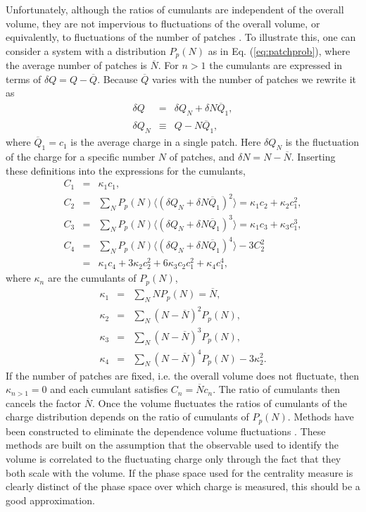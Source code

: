 Unfortunately, although the ratios of cumulants are independent of the overall volume, they are not impervious to fluctuations of the overall volume, or equivalently, to fluctuations of the number of patches \cite{Gazdzicki:1992ri,Gorenstein:2011vq,Gazdzicki:2013ana}. To illustrate this, one can consider a system with a distribution $P_p(N)$  as in Eq. (\ref{eq:patchprob}), where the average number of patches is $\overline{N}$. For $n>1$ the cumulants are expressed in terms of $\delta Q=Q-\overline{Q}$. Because $\overline{Q}$ varies with the number of patches we rewrite it as
\begin{eqnarray}
\delta Q&=&\delta Q_N+\delta N\overline{Q}_1,\\
\nonumber
\delta Q_N&\equiv&Q-N\overline{Q}_1,
\end{eqnarray}
where $\overline{Q}_1=c_1$ is the average charge in a single patch. Here $\delta Q_N$ is the fluctuation of the charge for a specific number $N$ of patches, and $\delta N=N-\overline{N}$. Inserting these definitions into the expressions for the cumulants,
\begin{eqnarray}\label{eq:volfluc}
C_1&=&\kappa_1c_1,\\
\nonumber
C_2&=&\sum_NP_p(N) \langle(\delta Q_N+\delta N\overline{Q}_1)^2\rangle=\kappa_1c_2+\kappa_2c_1^2,\\
\nonumber
C_3&=&\sum_NP_p(N) \langle(\delta Q_N+\delta N\overline{Q}_1)^3\rangle=\kappa_1c_3+\kappa_3c_1^3,\\
\nonumber
C_4&=&\sum_NP_p(N) \langle(\delta Q_N+\delta N\overline{Q}_1)^4\rangle-3C_2^2\\
\nonumber
&=&\kappa_1c_4+3\kappa_2c_2^2+6\kappa_3c_2c_1^2+\kappa_4c_1^4,
\end{eqnarray}
where $\kappa_n$ are the cumulants of $P_p(N)$,
\begin{eqnarray}\label{eq:kappadef2}
\kappa_1&=&\sum_N NP_p(N)=\overline{N},\\
\nonumber
\kappa_2&=&\sum_N (N-\overline{N})^2P_p(N),\\
\nonumber
\kappa_3&=&\sum_N (N-\overline{N})^3P_p(N),\\
\nonumber
\kappa_4&=&\sum_N (N-\overline{N})^4P_p(N)-3\kappa_2^2.
\end{eqnarray}
If the number of patches are fixed, i.e. the overall volume does not fluctuate, then $\kappa_{n>1}=0$ and each cumulant satisfies $C_n=\overline{N} c_n$. The ratio of cumulants then cancels the factor $\overline{N}$. 
Once the volume fluctuates the ratios of cumulants of the charge distribution depends on the ratio of cumulants of $P_p(N)$. Methods have been constructed to eliminate the dependence volume fluctuations \cite{Begun:2014boa,Gazdzicki:2013ana,Gorenstein:2011vq,Sangaline:2015bma}. These methods are built on the assumption that the observable used to identify the volume is correlated to the fluctuating charge only through the fact that they both scale with the volume. If the phase space used for the centrality measure is clearly distinct of the phase space over which charge is measured, this should be a good approximation. 

